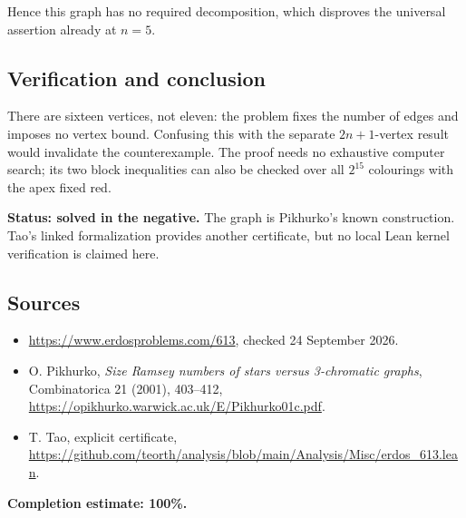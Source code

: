 Hence this graph has no required decomposition, which disproves the universal assertion already at $n=5$.

\subsection*{Verification and conclusion}
There are sixteen vertices, not eleven: the problem fixes the number of edges and imposes no vertex bound. Confusing this with the separate $2n+1$-vertex result would invalidate the counterexample. The proof needs no exhaustive computer search; its two block inequalities can also be checked over all $2^{15}$ colourings with the apex fixed red.

\textbf{Status: solved in the negative.} The graph is Pikhurko's known construction. Tao's linked formalization provides another certificate, but no local Lean kernel verification is claimed here.

\subsection*{Sources}
\begin{itemize}
\item \url{https://www.erdosproblems.com/613}, checked 24 September 2026.
\item O. Pikhurko, \emph{Size Ramsey numbers of stars versus 3-chromatic graphs}, Combinatorica 21 (2001), 403--412, \url{https://opikhurko.warwick.ac.uk/E/Pikhurko01c.pdf}.
\item T. Tao, explicit certificate, \url{https://github.com/teorth/analysis/blob/main/Analysis/Misc/erdos_613.lean}.
\end{itemize}
\noindent\textbf{Completion estimate: 100\%.}
